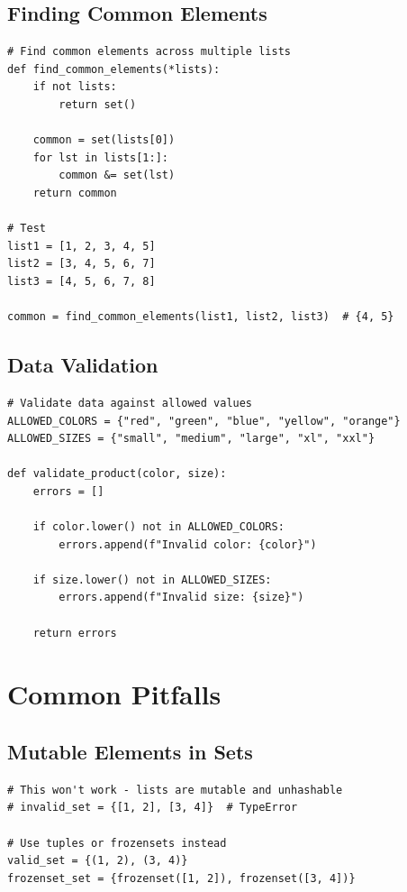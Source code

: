\documentclass[12pt,a4paper]{article}
\begin{document}
\subsection{Finding Common Elements}

\begin{lstlisting}
# Find common elements across multiple lists
def find_common_elements(*lists):
    if not lists:
        return set()
    
    common = set(lists[0])
    for lst in lists[1:]:
        common &= set(lst)
    return common

# Test
list1 = [1, 2, 3, 4, 5]
list2 = [3, 4, 5, 6, 7]
list3 = [4, 5, 6, 7, 8]

common = find_common_elements(list1, list2, list3)  # {4, 5}
\end{lstlisting}

\subsection{Data Validation}

\begin{lstlisting}
# Validate data against allowed values
ALLOWED_COLORS = {"red", "green", "blue", "yellow", "orange"}
ALLOWED_SIZES = {"small", "medium", "large", "xl", "xxl"}

def validate_product(color, size):
    errors = []
    
    if color.lower() not in ALLOWED_COLORS:
        errors.append(f"Invalid color: {color}")
    
    if size.lower() not in ALLOWED_SIZES:
        errors.append(f"Invalid size: {size}")
    
    return errors
\end{lstlisting}

\section{Common Pitfalls}

\subsection{Mutable Elements in Sets}

\begin{lstlisting}
# This won't work - lists are mutable and unhashable
# invalid_set = {[1, 2], [3, 4]}  # TypeError

# Use tuples or frozensets instead
valid_set = {(1, 2), (3, 4)}
frozenset_set = {frozenset([1, 2]), frozenset([3, 4])}
\end{lstlisting}
\end{document}

